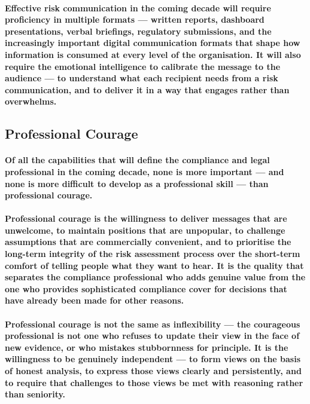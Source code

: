\paragraph{Effective risk communication in the coming decade will require proficiency in multiple formats — written reports, dashboard presentations, verbal briefings, regulatory submissions, and the increasingly important digital communication formats that shape how information is consumed at every level of the organisation. It will also require the emotional intelligence to calibrate the message to the audience — to understand what each recipient needs from a risk communication, and to deliver it in a way that engages rather than overwhelms.}

\subsection{Professional Courage}
\paragraph{Of all the capabilities that will define the compliance and legal professional in the coming decade, none is more important — and none is more difficult to develop as a professional skill — than professional courage.}
\paragraph{Professional courage is the willingness to deliver messages that are unwelcome, to maintain positions that are unpopular, to challenge assumptions that are commercially convenient, and to prioritise the long-term integrity of the risk assessment process over the short-term comfort of telling people what they want to hear. It is the quality that separates the compliance professional who adds genuine value from the one who provides sophisticated compliance cover for decisions that have already been made for other reasons.}
\paragraph{Professional courage is not the same as inflexibility — the courageous professional is not one who refuses to update their view in the face of new evidence, or who mistakes stubbornness for principle. It is the willingness to be genuinely independent — to form views on the basis of honest analysis, to express those views clearly and persistently, and to require that challenges to those views be met with reasoning rather than seniority.}
